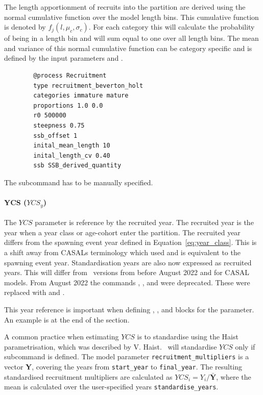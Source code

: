 The length apportionment of recruits into the partition are derived using the normal cumulative function over the model length bins. This cumulative function is denoted by \(f_j(l,\mu_c, \sigma_c)\). For each category this will calculate the probability of being in a length bin and will  sum equal to one over all length bins. The mean and variance of this normal cumulative function can be category specific and is defined by the input parameters  and .

{\small{\begin{verbatim}
		@process Recruitment
		type recruitment_beverton_holt
		categories immature mature
		proportions 1.0 0.0
		r0 500000
		steepness 0.75
		ssb_offset 1
		inital_mean_length 10
		inital_length_cv 0.40
		ssb SSB_derived_quantity
		\end{verbatim}}}

The subcommand  has to be manually specified.

\paragraph*{YCS ($YCS_y$)}

The $YCS$ parameter is reference by the recruited year. The recruited year is the year when a year class or age-cohort enter the partition. The recruited year differs from the spawning event year defined in Equation~\eqref{eq:year_class}. This is a shift away from CASALs terminology which used  and is equivalent to the spawning event year. Standardisation years are also now expressed as recruited years. This will differ from \CNAME\ versions from before August 2022 and for CASAL models. From August 2022 the commands , , and  were deprecated. These were replaced with  and .

This year reference is important when defining , , and  blocks for the  parameter. An example is at the end of the section.

A common practice when estimating $YCS$ is to standardise using the Haist parametrisation, which was described by V. Haist. \CNAME\ will standardise $YCS$ only if subcommand  is defined. The model parameter \texttt{recruitment\_multipliers} is a vector \textbf{Y}, covering the years from \texttt{start\_year} to \texttt{final\_year}. The resulting standardised recruitment multipliers are calculated as $YCS_i=Y_i/\bar{\textbf{Y}}$, where the mean is calculated over the user-specified years \texttt{standardise\_years}.

